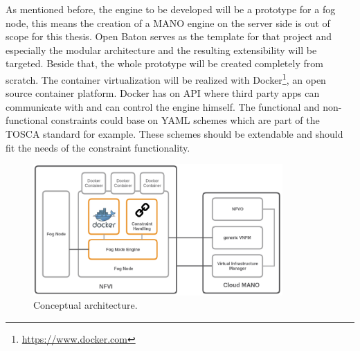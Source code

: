 
As mentioned before, the engine to be developed will be a prototype for a fog node, this means the creation of a \ac{MANO} engine on the server side is out of scope for this thesis.
Open Baton serves as the template for that project and especially the modular architecture and the resulting extensibility will be targeted.
Beside that, the whole prototype will be created completely from scratch.
The container virtualization will be realized with Docker\footnote{\url{https://www.docker.com}}, an open source container platform.
Docker has on \ac{API} where third party apps can communicate with and can control the engine himself.
The functional and non-functional constraints could base on \ac{YAML} schemes which are part of the \ac{TOSCA} standard for example.
These schemes should be extendable and should fit the needs of the constraint functionality.

\begin{figure}[H]
    \centering
    \includegraphics[width=0.85\textwidth]{resources/images/conceptual_architecture.png}
    \caption[Conceptual architecture]{Conceptual architecture.}
    \label{fig:conceptual_architecture}
\end{figure}

